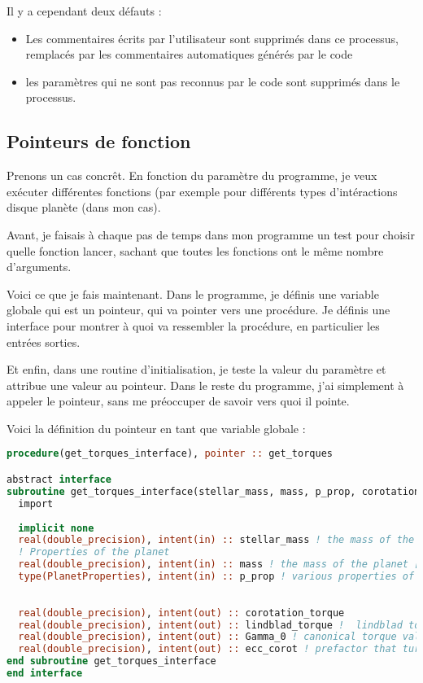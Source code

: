 Il y a cependant deux défauts : 
\begin{itemize}
\item Les commentaires écrits par l'utilisateur sont supprimés dans ce processus, remplacés par les commentaires automatiques générés par le code
\item les paramètres qui ne sont pas reconnus par le code sont supprimés dans le processus. 
\end{itemize}

\subsection{Pointeurs de fonction}
Prenons un cas concrêt. En fonction du paramètre du programme, je veux exécuter différentes fonctions (par exemple pour différents types d'intéractions disque planète (dans mon cas). 

Avant, je faisais à chaque pas de temps dans mon programme un test pour choisir quelle fonction lancer, sachant que toutes les fonctions ont le même nombre d'arguments. 

\bigskip

Voici ce que je fais maintenant. Dans le programme, je définis une variable globale qui est un pointeur, qui va pointer vers une procédure. Je définis une interface pour montrer à quoi va ressembler la procédure, en particulier les entrées sorties. 

Et enfin, dans une routine d'initialisation, je teste la valeur du paramètre et attribue une valeur au pointeur. Dans le reste du programme, j'ai simplement à appeler le pointeur, sans me préoccuper de savoir vers quoi il pointe.

Voici la définition du pointeur en tant que variable globale : 
\begin{lstlisting}[language=Fortran]
procedure(get_torques_interface), pointer :: get_torques

abstract interface 
subroutine get_torques_interface(stellar_mass, mass, p_prop, corotation_torque, lindblad_torque, Gamma_0, ecc_corot)
  import 
  
  implicit none
  real(double_precision), intent(in) :: stellar_mass ! the mass of the central body [Msun * K2]
  ! Properties of the planet
  real(double_precision), intent(in) :: mass ! the mass of the planet [Msun * K2]
  type(PlanetProperties), intent(in) :: p_prop ! various properties of the planet
  
  
  real(double_precision), intent(out) :: corotation_torque
  real(double_precision), intent(out) :: lindblad_torque !  lindblad torque exerted by the disk on the planet [\Gamma_0]
  real(double_precision), intent(out) :: Gamma_0 ! canonical torque value [Ms.AU^2](equation (8) of Paardekooper, Baruteau, 2009)
  real(double_precision), intent(out) :: ecc_corot ! prefactor that turns out the corotation torque if the eccentricity is too high (Bitsch & Kley, 2010)
end subroutine get_torques_interface
end interface
\end{lstlisting}

